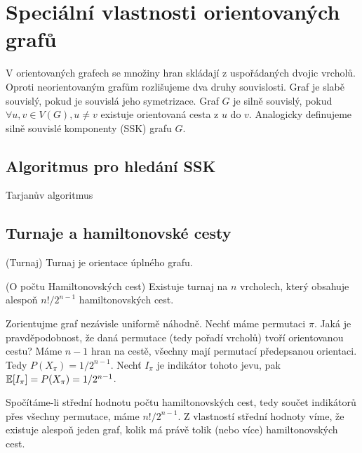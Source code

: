 \section{Speciální vlastnosti orientovaných grafů}

V orientovaných grafech se množiny hran skládají z uspořádaných dvojic vrcholů.
Oproti neorientovaným grafům rozlišujeme dva druhy souvislosti. Graf je slabě
souvislý, pokud je souvislá jeho symetrizace. Graf $G$ je silně souvislý, pokud
$\forall u,v \in V(G), u\neq v$ existuje orientovaná cesta z $u$ do $v$.
Analogicky definujeme silně souvislé komponenty (SSK) grafu $G$.

\subsection{Algoritmus pro hledání SSK}

\todo Tarjanův algoritmus

\subsection{Turnaje a hamiltonovské cesty}

\df (Turnaj) Turnaj je orientace úplného grafu.

\vt (O počtu Hamiltonovských cest) Existuje turnaj na $n$ vrcholech, který 
obsahuje alespoň $n!/2^{n-1}$ hamiltonovských cest.

\dk Zorientujme graf nezávisle uniformě náhodně. Nechť máme permutaci $\pi$.  
Jaká je pravděpodobnost, že daná permutace (tedy pořadí vrcholů) tvoří 
orientovanou cestu? Máme $n-1$ hran na cestě, všechny mají permutací 
předepsanou orientaci. Tedy $P(X_\pi)= 1/2^{n-1}$. Nechť $I_\pi$ je indikátor 
tohoto jevu, pak $\mathbb{E}[I_\pi] = P(X_\pi) = 1/2^{n-1}$.

Spočítáme-li střední hodnotu počtu hamiltonovských cest, tedy součet indikátorů 
přes všechny permutace, máme $n!/2^{n-1}$. Z vlastností střední hodnoty víme, 
že existuje alespoň jeden graf, kolik má právě tolik (nebo více) 
hamiltonovských cest.
